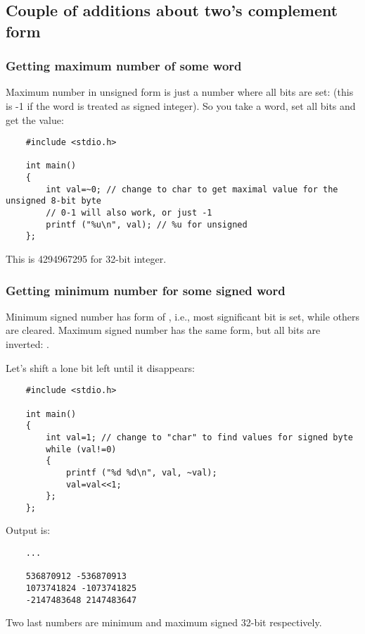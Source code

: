 \subsection{Couple of additions about two's complement form}

\subsubsection{Getting maximum number of some \gls{word}}

Maximum number in unsigned form is just a number where all bits are set: 
(this is -1 if the \gls{word} is treated as signed integer).
So you take a \gls{word}, set all bits and get the value:

\begin{lstlisting}
	#include <stdio.h>

	int main()
	{
		int val=~0; // change to char to get maximal value for the unsigned 8-bit byte
		// 0-1 will also work, or just -1
		printf ("%u\n", val); // %u for unsigned
	};
\end{lstlisting}

This is 4294967295 for 32-bit integer.

\subsubsection{Getting minimum number for some signed \gls{word}}

Minimum signed number has form of , i.e., most significant bit is set, while others are cleared.
Maximum signed number has the same form, but all bits are inverted: .

Let's shift a lone bit left until it disappears:

\begin{lstlisting}
	#include <stdio.h>

	int main()
	{
		int val=1; // change to "char" to find values for signed byte
		while (val!=0)
		{
			printf ("%d %d\n", val, ~val);
			val=val<<1;
		};
	};
\end{lstlisting}

Output is:

\begin{lstlisting}
	...

	536870912 -536870913
	1073741824 -1073741825
	-2147483648 2147483647
\end{lstlisting}

Two last numbers are minimum and maximum signed 32-bit  respectively.

